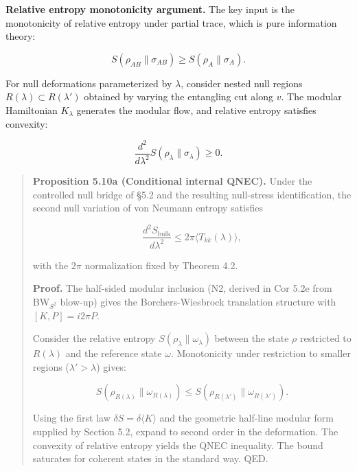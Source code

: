 \textbf{Relative entropy monotonicity argument.} The key input is the monotonicity of relative entropy under partial trace, which is pure information theory:

\[
S(\rho_{AB} \| \sigma_{AB}) \ge S(\rho_A \| \sigma_A).
\]

For null deformations parameterized by \(\lambda\), consider nested null regions \(R(\lambda) \subset R(\lambda')\) obtained by varying the entangling cut along \(v\). The modular Hamiltonian \(K_\lambda\) generates the modular flow, and relative entropy satisfies convexity:

\[
\frac{d^2}{d\lambda^2} S(\rho_\lambda \| \sigma_\lambda) \ge 0.
\]

\begin{quote}
\textbf{Proposition 5.10a (Conditional internal QNEC).} Under the controlled null bridge of §5.2 and the resulting null-stress identification, the second null variation of von Neumann entropy satisfies

\[
\frac{d^2 S_{\mathrm{bulk}}}{d\lambda^2} \le 2\pi \langle T_{kk}(\lambda) \rangle,
\]

with the \(2\pi\) normalization fixed by Theorem 4.2.

\textbf{Proof.} The half-sided modular inclusion (N2, derived in Cor 5.2e from BW\(_{S^2}\) blow-up) gives the Borchers-Wiesbrock translation structure with \([K, P] = i 2\pi P\).

Consider the relative entropy \(S(\rho_\lambda \| \omega_\lambda)\) between the state \(\rho\) restricted to \(R(\lambda)\) and the reference state \(\omega\). Monotonicity under restriction to smaller regions (\(\lambda' > \lambda\)) gives:

\[
S(\rho_{R(\lambda)} \| \omega_{R(\lambda)}) \le S(\rho_{R(\lambda')} \| \omega_{R(\lambda')}).
\]

Using the first law \(\delta S = \delta \langle K \rangle\) and the geometric half-line modular form supplied by Section 5.2, expand to second order in the deformation. The convexity of relative entropy yields the QNEC inequality. The bound saturates for coherent states in the standard way. QED.
\end{quote}

